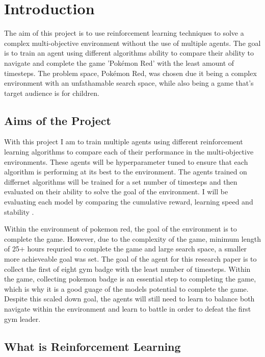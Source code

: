 \section{Introduction}

The aim of this project is to use reinforcement learning techniques to solve a complex multi-objective environment without the use of multiple agents. The goal is to train an agent using different algorithms ability to compare their ability to navigate and complete the game 'Pokémon Red' with the least amount of timesteps. The problem space, Pokémon Red, was chosen due it being a complex environment with an unfathamable search space, while also being a game that's target audience is for children.

\subsection{Aims of the Project}

With this project I am to train multiple agents using different reinforcement learning algorithms to compare each of their performance in the multi-objective environments. These agents will be hyperparameter tuned to ensure that each algorithm is performing at its best to the environment. The agents trained on differnet algorithms will be trained for a set number of timesteps and then evaluated on their ability to solve the goal of the environment. I will be evaluating each model by comparing the cumulative reward, learning speed and stability \cite{Sutton1}. 

Within the environment of pokemon red, the goal of the environment is to complete the game. However, due to the complexity of the game, minimum length of 25+ hours requried to complete the game and large search space, a smaller more achieveable goal was set. The goal of the agent for this research paper is to collect the first of eight gym badge with the least number of timesteps. Within the game, collecting pokemon badge is an essential step to completing the game, which is why it is a good guage of the models potential to complete the game. Despite this scaled down goal, the agents will still need to learn to balance both navigate within the environment and learn to battle in order to defeat the first gym leader.

\subsection{What is Reinforcement Learning}

